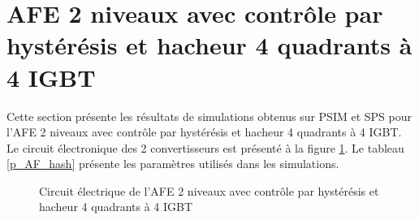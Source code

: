 \section{AFE 2 niveaux avec contrôle par hystérésis et hacheur 4 quadrants à 4 IGBT}
Cette section présente les résultats de simulations obtenus sur PSIM et SPS pour l'AFE 2 niveaux avec contrôle par hystérésis et hacheur 4 quadrants à 4 IGBT. Le circuit électronique des 2 convertisseurs est présenté à la figure \ref{circuit_H4Q_AFE_2L_RC}. Le tableau \ref{p_AF_hash} présente les paramètres utilisés dans les simulations.

\begin{figure}[htb]
\caption{Circuit électrique de l'AFE 2 niveaux avec contrôle par hystérésis et hacheur 4 quadrants à 4 IGBT}
\label{circuit_H4Q_AFE_2L_RC}
\end{figure}



